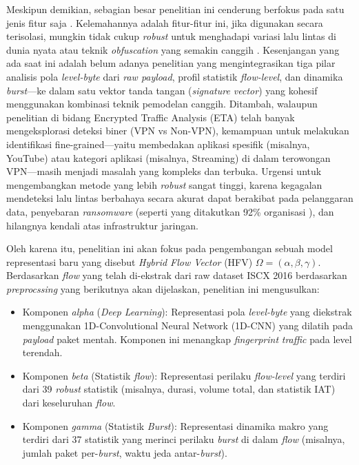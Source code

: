 Meskipun demikian, sebagian besar penelitian ini cenderung berfokus pada satu jenis fitur saja \citep{velan2015survey, aminuddin2018survey}. Kelemahannya adalah fitur-fitur ini, jika digunakan secara terisolasi, mungkin tidak cukup \textit{robust} untuk menghadapi variasi lalu lintas di dunia nyata \citep{aceto2021distiller} atau teknik \textit{obfuscation} yang semakin canggih \citep{sharma2024survey}. Kesenjangan yang ada saat ini \citep{sharma2024survey} adalah belum adanya penelitian yang mengintegrasikan tiga pilar analisis pola \textit{level-byte} dari \textit{raw payload}, profil statistik \textit{flow-level}, dan dinamika \textit{burst}—ke dalam satu vektor tanda tangan (\textit{signature vector}) yang kohesif menggunakan kombinasi teknik pemodelan canggih. Ditambah, walaupun penelitian di bidang Encrypted Traffic Analysis (ETA) telah banyak mengeksplorasi deteksi biner (VPN vs Non-VPN), kemampuan untuk melakukan identifikasi fine-grained—yaitu membedakan aplikasi spesifik (misalnya, YouTube) atau kategori aplikasi (misalnya, Streaming) di dalam terowongan VPN—masih menjadi masalah yang kompleks dan terbuka. Urgensi untuk mengembangkan metode yang lebih \textit{robust} sangat tinggi, karena kegagalan mendeteksi lalu lintas berbahaya secara akurat dapat berakibat pada pelanggaran data, penyebaran \textit{ransomware} (seperti yang ditakutkan 92\% organisasi \citep{zscalerZscalerThreatLabz}), dan hilangnya kendali atas infrastruktur jaringan.

Oleh karena itu, penelitian ini akan fokus pada pengembangan sebuah model representasi baru yang disebut \textit{Hybrid Flow Vector} (HFV) $\Omega = (\alpha, \beta, \gamma)$. Berdasarkan \textit{flow} yang telah di-ekstrak dari raw dataset ISCX 2016 berdasarkan \textit{preprocssing} yang berikutnya akan dijelaskan, penelitian ini mengusulkan:
\begin{itemize}
    \item Komponen \textit{alpha} (\textit{Deep Learning}): Representasi pola \textit{level-byte} yang diekstrak menggunakan 1D-Convolutional Neural Network (1D-CNN) yang dilatih pada \textit{payload} paket mentah. Komponen ini menangkap \textit{fingerprint} \textit{traffic} pada level terendah.
    \item Komponen \textit{beta} (Statistik \textit{flow}): Representasi perilaku \textit{flow-level} yang terdiri dari 39 \textit{robust} statistik (misalnya, durasi, volume total, dan statistik IAT) dari keseluruhan \textit{flow}.
    \item Komponen \textit{gamma} (Statistik \textit{Burst}): Representasi dinamika makro yang terdiri dari 37 statistik yang merinci perilaku \textit{burst} di dalam \textit{flow} (misalnya, jumlah paket per-\textit{burst}, waktu jeda antar-\textit{burst}).
\end{itemize}

